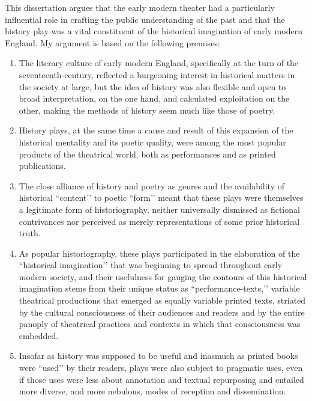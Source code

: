 This dissertation argues that the early modern theater had a particularly influential role in crafting the public understanding of the past and that the history play was a vital constituent of the historical imagination of early modern England. My argument is based on the following premises:
\begin{enumerate}
\item The literary culture of early modern England, specifically at the turn of the seventeenth-century, reflected a burgeoning interest in historical matters in the society at large, but the idea of history was also flexible and open to broad interpretation, on the one hand, and calculated exploitation on the other, making the methods of history seem much like those of poetry.
\item History plays, at the same time a cause and result of this expansion of the historical mentality and its poetic quality, were among the most popular products of the theatrical world, both as performances and as printed publications.
\item The close alliance of history and poetry as genres and the availability of historical ``content’’ to poetic ``form’’ meant that these plays were themselves a legitimate form of historiography, neither universally dismissed as fictional contrivances nor perceived as merely representations of some prior historical truth.
\item As popular historiography, these plays participated in the elaboration of the ``historical imagination’’ that was beginning to spread throughout early modern society, and their usefulness for gauging the contours of this historical imagination stems from their unique status as ``performance-texts,’’ variable theatrical productions that emerged as equally variable printed texts, striated by the cultural consciousness of their audiences and readers and by the entire panoply of theatrical practices and contexts in which that consciousness was embedded.
\item Insofar as history was supposed to be useful and inasmuch as printed books were ``used’’ by their readers, plays were also subject to pragmatic uses, even if those uses were less about annotation and textual repurposing and entailed more diverse, and more nebulous, modes of reception and dissemination.
\end{enumerate}

